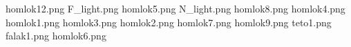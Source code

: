 homlok12.png
F_light.png
homlok5.png
N_light.png
homlok8.png
homlok4.png
homlok1.png
homlok3.png
homlok2.png
homlok7.png
homlok9.png
teto1.png
falak1.png
homlok6.png
